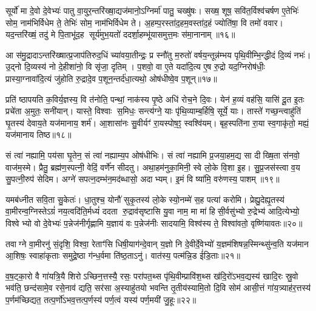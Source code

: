 सूर्यो॑ मा दे॒वो दे॒वेभ्यः॑ पातु वा॒युर॒न्तरि॑ख्षा॒द्यज॑मानो॒ऽग्निर्मा॑ पातु॒ चख्षु॑षः। सख्ष॒ शूष॒ सवि॑त॒र्विश्व॑चर्\mbox{}षण ए॒तेभिः॑ सोम॒ नाम॑भिर्विधेम ते॒ तेभिः॑ सोम॒ नाम॑भिर्विधेम ते। अ॒हम्प॒रस्ता॑द॒हम॒वस्ता॑द॒हं ज्योति॑षा॒ वि तमो॑ ववार। यद॒न्तरि॑ख्षं॒ तदु॑ मे पि॒ताभू॑द॒ह सूर्य॑मुभ॒यतो॑ ददर्\mbox{}शा॒हम्भू॑यासमुत्त॒मः स॑मा॒नानाम्॥१६॥

आ स॑मु॒द्रादाऽन्तरि॑ख्षात्प्र॒जाप॑तिरुद॒धिं च्या॑वया॒तीन्द्रः॒ प्र स्नौ॑तु म॒रुतो॑ वर्\mbox{}षय॒न्तून्न॑म्भय पृथि॒वीम्भि॒न्द्धीदं दि॒व्यं नभः॑। उ॒द्नो दि॒व्यस्य॑ नो दे॒हीशा॑नो॒ वि सृ॑जा॒ दृतिम्। प॒शवो॒ वा ए॒ते यदा॑दि॒त्य ए॒ष रु॒द्रो यद॒ग्निरोष॑धीः॒ प्रास्या॒ग्नावा॑दि॒त्यं जु॑होति रु॒द्रादे॒व प॒शून॒न्तर्द॑धा॒त्यथो॒ ओष॑धीष्वे॒व प॒शून्॥१७॥

प्रति॑ ष्ठापयति क॒विर्य॒ज्ञस्य॒ वि त॑नोति॒ पन्थां॒ नाक॑स्य पृ॒ष्ठे अधि॑ रोच॒ने दि॒वः। येन॑ ह॒व्यं वह॑सि॒ यासि॑ दू॒त इ॒तः प्रचे॑ता अ॒मुतः॒ सनी॑यान्। यास्ते॒ विश्वाः स॒मिधः॒ सन्त्य॑ग्ने॒ याः पृ॑थि॒व्याम्ब॒र्\mbox{}हिषि॒ सूर्ये॒ याः। तास्ते॑ गच्छ॒न्त्वाहु॑तिं घृ॒तस्य॑ देवाय॒ते यज॑मानाय॒ शर्म॑। आ॒शासा॑नः सु॒वीर्यꣳ॑ रा॒यस्पोष॒ꣵ॒ स्वश्वि॑यम्। बृह॒स्पति॑ना रा॒या स्व॒गाकृ॑तो॒ मह्यं॒ यज॑मानाय तिष्ठ॥१८॥

{\anuvakamend[{स॒मा॒नाना॒मोष॑धीष्वे॒व प॒शून्मह्यं॒ यज॑माना॒यैक॑ञ्च॥५॥}]}

सं त्वा॑ नह्यामि॒ पय॑सा घृ॒तेन॒ सं त्वा॑ नह्याम्य॒प ओष॑धीभिः। सं त्वा॑ नह्यामि प्र॒जया॒हम॒द्य सा दीख्षि॒ता स॑नवो॒ वाज॑म॒स्मे। प्रैतु॒ ब्रह्म॑ण॒स्पत्नी॒ वेदिं॒ वर्णे॑न सीदतु। अथा॒हम॑नुका॒मिनी॒ स्वे लो॒के वि॒शा इ॒ह। सु॒प्र॒जस॑स्त्वा व॒य सु॒पत्नी॒रुप॑ सेदिम। अग्ने॑ सपत्न॒दम्भ॑न॒मद॑ब्धासो॒ अदाभ्यम्। इ॒मं वि ष्या॑मि॒ वरु॑णस्य॒ पाशम्॥१९॥

यमब॑ध्नीत सवि॒ता सु॒केतः॑। धा॒तुश्च॒ योनौ॑ सुकृ॒तस्य॑ लो॒के स्यो॒नम्मे॑ स॒ह पत्या॑ करोमि। प्रेह्यु॒देह्यृ॒तस्य॑ वा॒मीरन्व॒ग्निस्तेऽग्रं॑ नय॒त्वदि॑ति॒र्मध्यं॑ ददता रु॒द्राव॑सृष्टासि यु॒वा नाम॒ मा मा॑ हिसी॒र्वसु॑भ्यो रु॒द्रेभ्य॑ आदि॒त्येभ्यो॒ विश्वेभ्यो वो दे॒वेभ्यः॑ प॒न्नेज॑नीर्गृह्णामि य॒ज्ञाय॑ वः प॒न्नेज॑नीः सादयामि॒ विश्व॑स्य ते॒ विश्वा॑वतो॒ वृष्णि॑यावतः॥२०॥

तवाग्ने वा॒मीरनु॑ सं॒दृशि॒ विश्वा॒ रेताꣳ॑सि धिषी॒याग॑न्दे॒वान् य॒ज्ञो नि दे॒वीर्दे॒वेभ्यो॑ य॒ज्ञम॑शिषन्न॒स्मिन्थ्सु॑न्व॒ति यज॑मान आ॒शिषः॒ स्वाहा॑कृताः समुद्रे॒ष्ठा ग॑न्ध॒र्वमा ति॑ष्ठ॒ताऽनु॑। वात॑स्य॒ पत्म॑न्नि॒ड ई॑डि॒ताः॥२१॥

{\anuvakamend[{पाशं॒ वृष्णि॑यावतस्त्रि॒ꣳ॒शच्च॑॥६॥}]}

व॒ष॒ट्का॒रो वै गा॑यत्रि॒यै शिरोऽच्छिन॒त्तस्यै॒ रसः॒ परा॑पत॒थ्स पृ॑थि॒वीम्प्रावि॑श॒थ्स ख॑दि॒रो॑ऽभव॒द्यस्य॑ खादि॒रः स्रु॒वो भव॑ति॒ छन्द॑सामे॒व रसे॒नाव॑ द्यति॒ सर॑सा अ॒स्याहु॑तयो भवन्ति तृ॒तीय॑स्यामि॒तो दि॒वि सोम॑ आसी॒त्तं गा॑य॒त्र्याह॑र॒त्तस्य॑ प॒र्णम॑च्छिद्यत॒ तत्प॒र्णो॑ऽभव॒त्तत्प॒र्णस्य॑ पर्ण॒त्वं यस्य॑ पर्ण॒मयी॑ जु॒हूः॥२२॥

